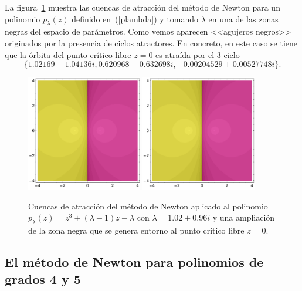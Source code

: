 La figura~\ref{esparam_fig3} muestra las cuencas de atracción del método de Newton para un polinomio $p_{\lambda}(z)$ definido en~(\ref{plambda}) y tomando $\lambda$ en una de las zonas negras del espacio de parámetros. Como vemos aparecen <<agujeros negros>> originados por la presencia de ciclos atractores. En concreto, en este caso se tiene que la órbita del punto crítico libre $z=0$ es atraída por el 3-ciclo
$$
\{1.02169 - 1.04136i, 0.620968  - 0.632698 i, -0.00204529 + 
 0.00527748 i \}.
$$

\begin{figure}[htb]
\centering
\includegraphics[width=0.45\textwidth]{NDfigura0.pdf}
\qquad
 \includegraphics[width=0.45\textwidth]{NDfigura0.pdf}
\caption{Cuencas de atracción del método de Newton aplicado al  polinomio $p_{\lambda}(z)=z^3+(\lambda-1)z-\lambda$ con $\lambda=1.02+0.96i$ y una ampliación de la zona negra que se genera entorno al punto crítico libre $z=0$.}
 \label{esparam_fig3}
\end{figure}


\subsection{El método de Newton para polinomios de grados 4 y 5} 

